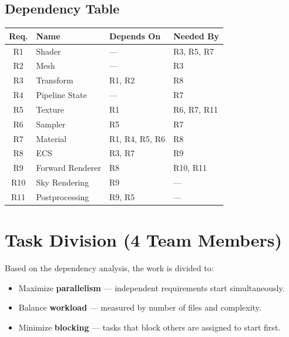 \documentclass[12pt,a4paper]{article}
\begin{document}
\subsection{Dependency Table}

\begin{center}
\renewcommand{\arraystretch}{1.25}
\begin{tabular}{c l l l}
\toprule
\textbf{Req.} & \textbf{Name} & \textbf{Depends On} & \textbf{Needed By} \\
\midrule
R1  & Shader         & ---                 & R3, R5, R7 \\
R2  & Mesh           & ---                 & R3 \\
R3  & Transform      & R1, R2              & R8 \\
R4  & Pipeline State & ---                 & R7 \\
R5  & Texture        & R1                  & R6, R7, R11 \\
R6  & Sampler        & R5                  & R7 \\
R7  & Material       & R1, R4, R5, R6      & R8 \\
R8  & ECS            & R3, R7              & R9 \\
R9  & Forward Renderer & R8                & R10, R11 \\
R10 & Sky Rendering  & R9                  & --- \\
R11 & Postprocessing & R9, R5              & --- \\
\bottomrule
\end{tabular}
\end{center}

\section{Task Division (4 Team Members)}

Based on the dependency analysis, the work is divided to:
\begin{itemize}[nosep]
  \item Maximize \textbf{parallelism} --- independent requirements start simultaneously.
  \item Balance \textbf{workload} --- measured by number of files and complexity.
  \item Minimize \textbf{blocking} --- tasks that block others are assigned to start first.
\end{itemize}
\end{document}
